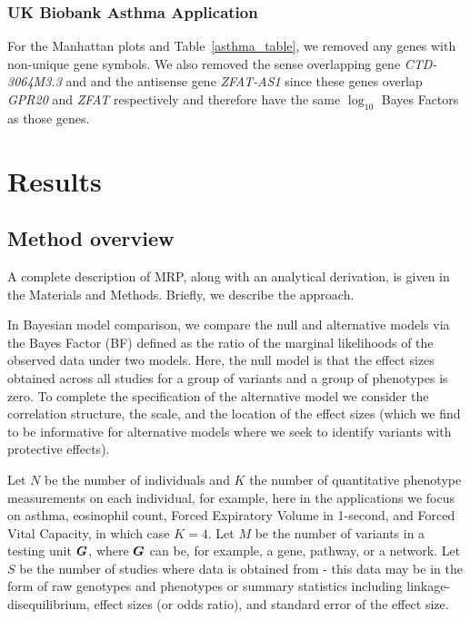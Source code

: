 \subsubsection*{UK Biobank Asthma Application}
For the Manhattan plots and Table~\ref{asthma_table}, we removed any genes with non-unique gene symbols. We also removed the sense overlapping gene \textit{CTD-3064M3.3} and and the antisense gene \textit{ZFAT-AS1} since these genes overlap \textit{GPR20} and \textit{ZFAT} respectively and therefore have the same $\log_{10}$ Bayes Factors as those genes.


\section*{Results}

\subsection*{Method overview}
A complete description of MRP, along with an analytical derivation, is given in the Materials and Methods. Briefly, we describe the approach.

In Bayesian model comparison, we compare the null and alternative models via the Bayes Factor (BF) defined as the ratio of the marginal likelihoods of the observed data under two models. Here, the null model is that the effect sizes obtained across all studies for a group of variants and a group of phenotypes is zero. To complete the specification of the alternative model we consider the correlation structure, the scale, and the location of the effect sizes (which we find to be informative for alternative models where we seek to identify variants with protective effects). 

Let $N$ be the number of individuals and $K$ the number of quantitative phenotype measurements on each individual, for example, here in the applications we focus on asthma, eosinophil count, Forced Expiratory Volume in 1-second, and Forced Vital Capacity, in which case $K=4$. Let $M$ be the number of variants in a testing unit ${\boldsymbol G}$, where ${\boldsymbol G}$ can be, for example, a gene, pathway, or a network. Let $S$ be the number of studies where data is obtained from - this data may be in the form of raw genotypes and phenotypes or summary statistics including linkage-disequilibrium, effect sizes (or odds ratio), and standard error of the effect size.


